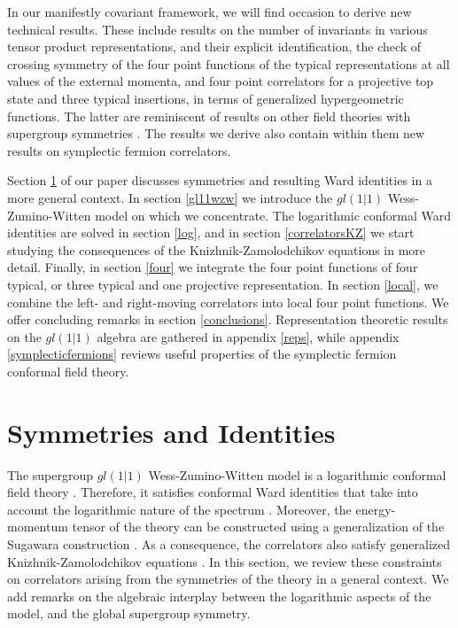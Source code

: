 \documentclass[12pt]{article}
\numberwithin{equation}{section}
\numberwithin{equation}{section}
\numberwithin{table}{section}\setlength{\multlinegap}{25pt}
\begin{document}
 In our manifestly covariant framework, we
 will find occasion to derive new technical results.
These include results on the number of invariants in various tensor product representations, and their explicit
identification, the check of crossing symmetry
of the four point functions of the typical representations at all
values of the external momenta, and four point
correlators for a projective top state and three typical insertions, in terms
of generalized hypergeometric functions. The latter are reminiscent of results on other field theories with supergroup symmetries \cite{Maassarani:1996jn}.
The results we derive also contain within them new results on symplectic fermion correlators.

Section \ref{symmetries} of our paper discusses symmetries and resulting Ward identities  in a more general context.
In section \ref{gl11wzw} we introduce the $gl(1|1)$ Wess-Zumino-Witten model on which we concentrate. The logarithmic conformal
Ward identities are solved in section \ref{log}, and in section
\ref{correlatorsKZ} we start studying the consequences of the Knizhnik-Zamolodchikov equations in more detail. 
Finally, in section \ref{four} we integrate the four point functions of four typical, or three typical and one projective representation.
In section \ref{local}, we combine the left- and right-moving correlators into local   four point functions. We offer concluding
remarks in section \ref{conclusions}. Representation theoretic results on the $gl(1|1)$ algebra are gathered in appendix \ref{reps},
while appendix \ref{symplecticfermions} reviews useful properties of the symplectic fermion conformal field theory.




\section{Symmetries and Identities}
\label{symmetries}
The supergroup $gl(1|1)$ Wess-Zumino-Witten model is a logarithmic conformal
field theory \cite{Rozansky:1992rx,Rozansky:1992td}. Therefore, it satisfies conformal Ward identities that
take into account the logarithmic nature of the spectrum \cite{Flohr:2001zs}. Moreover,
the energy-momentum tensor of the theory can be constructed using a
generalization of the Sugawara construction \cite{Rozansky:1992rx}. As a consequence, the
correlators also satisfy generalized Knizhnik-Zamolodchikov equations \cite{Knizhnik:1984nr}.
In this section, we review these constraints on correlators arising
from the symmetries of the theory in a general context. We add   remarks
on the algebraic interplay between the logarithmic aspects of the model, and the
global supergroup symmetry.
\end{document}
